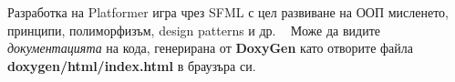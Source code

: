 Разработка на Platformer игра чрез S\+F\+ML с цел развиване на ООП мисленето, принципи, полиморфизъм, design patterns и др. ~\newline
 Може да видите {\itshape документацията} на кода, генерирана от {\bfseries{Doxy\+Gen}} като отворите файла {\bfseries{doxygen/html/index.\+html}} в браузъра си. 